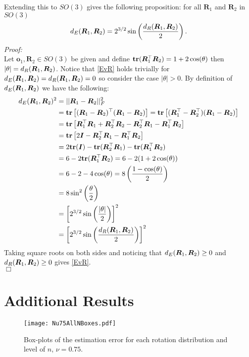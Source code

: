 Extending this to $SO(3)$ gives the following proposition: for all $\bm{R}_1$ and $\bm{R}_2$ in $SO(3)$
\begin{equation}\label{EvR}
{d_E} (\bm{R}_1,\bm{R}_2)=2^{3/2}\sin\left(\frac{{d_R}(\bm{R}_1,\bm{R}_2)}{2}\right).
\end{equation}
\emph{Proof:}\\
Let $\bm{o}_1,\bm{R}_2\in SO(3)$ be given and define ${\mathbf{tr}}(\bm R_1^\top\bm R_2)=1+2\cos(\theta)$ then $|\theta|={d_R}(\bm R_1,\bm R_2)$.  Notice that \eqref{EvR} holds trivially for ${d_E} (\bm R_1,\bm R_2)={d_R}(\bm R_1,\bm R_2)=0$ so consider the case $|\theta|>0$.  By definition of ${d_E} (\bm R_1,\bm R_2)$ we have the following:
\begin{align*}
{d_E} (\bm R_1,\bm R_2)^2
&=||\bm R_1-\bm R_2||_F^2\\
&={\mathbf{tr}}\left[(\bm R_1-\bm R_2)^\top(\bm R_1-\bm R_2)\right]={\mathbf{tr}}\left[(\bm R_1^\top-\bm R_2^\top)(\bm R_1-\bm R_2)\right]\\
&={\mathbf{tr}}\left[\bm R_1^\top\bm R_1+\bm R_2^\top\bm R_2-\bm R_2^\top\bm R_1-\bm R_1^\top\bm R_2\right]\\
&={\mathbf{tr}}\left[2\bm{I}-\bm R_2^\top\bm R_1-\bm R_1^\top\bm R_2\right]\\
&=2{\mathbf{tr}}(\bm{I})-{\mathbf{tr}}(\bm R_2^\top\bm R_1)-{\mathbf{tr}}(\bm R_1^\top\bm R_2)\\
&=6-2{\mathbf{tr}}(\bm R_1^\top\bm R_2)=6-2(1+2\cos(\theta))\\
&=6-2-4\cos(\theta)=8\left(\frac{1-\cos(\theta)}{2}\right)\\
&=8\sin^2\left(\frac{\theta}{2}\right)\\
&=\left[2^{3/2}\sin\left(\frac{|\theta|}{2}\right)\right]^2\\
&=\left[2^{3/2}\sin\left(\frac{{d_R}(\bm R_1,\bm R_2)}{2}\right)\right]^2
\end{align*}
Taking square roots on both sides and noticing that ${d_E} (\bm R_1,\bm R_2)\geq0$ and ${d_R} (\bm R_1,\bm R_2)\geq0$ gives \eqref{EvR}.\\
$\Box$

\section{Additional Results}

\begin{figure}[h!]
\centering
\texttt{[image: Nu75AllNBoxes.pdf]}
\caption{Box-plots of the estimation error for each rotation distribution and level of $n$,  $\nu=0.75$.}
\label{fig:NBoxes}
\end{figure}

